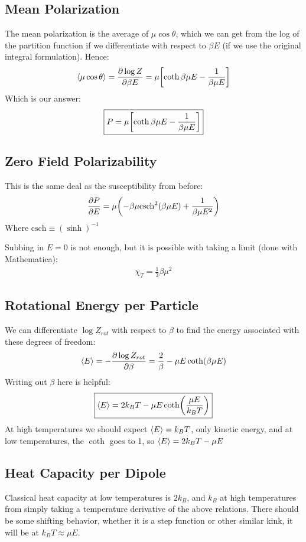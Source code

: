 \documentclass[12pt]{article}
\begin{document}
\subsection{Mean Polarization}
The mean polarization is the average of $\mu\cos\theta$, which we can get from the log of the partition function if we differentiate with respect to $\beta E$ (if we use the original integral formulation). Hence:
\begin{align*}
  \ev{\mu\cos\theta}=\pdv{\log Z}{\beta E}=
  \mu\qty[\coth\beta\mu E-\frac1{\beta\mu E}]
\end{align*}
Which is our answer:
\begin{align}
  \boxed{P=\mu\qty[\coth\beta\mu E-\frac1{\beta\mu E}]}
\end{align}
\subsection{Zero Field Polarizability}
This is the same deal as the susceptibility from before:
\begin{align*}
  \pdv{P}{E}=\mu\qty(-\beta\mu\mathrm{csch}^2(\beta\mu E)+\frac1{\beta\mu E^2})
\end{align*}
Where $\mathrm{csch}\equiv(\sinh)^{-1}$

Subbing in $E=0$ is not enough, but it is possible with taking a limit (done with Mathematica):
\begin{align}
  \boxed{\chi_T=\frac13\beta\mu^2}
\end{align}
\subsection{Rotational Energy per Particle}
We can differentiate $\log Z_{rot}$ with respect to $\beta$ to find the energy associated with these degrees of freedom:
\begin{align*}
  \ev{E}=-\pdv{\log Z_{rot}}{\beta}=\frac2\beta-\mu E\coth(\beta\mu E)
\end{align*}
Writing out $\beta$ here is helpful:
\begin{align}
  \boxed{\ev{E}=2k_BT-\mu E\coth(\frac{\mu E}{k_BT})}
\end{align}
At high temperatures we should expect $\ev{E}=k_BT$, only kinetic energy, and at low temperatures, the $\coth$ goes to 1, so $\ev{E}=2k_BT-\mu E$
\subsection{Heat Capacity per Dipole}
Classical heat capacity at low temperatures is $2k_B$, and $k_B$ at high temperatures from simply taking a temperature derivative of the above relations. There should be some shifting behavior, whether it is a step function or other similar kink, it will be at $k_BT\approx\mu E$.
\end{document}
